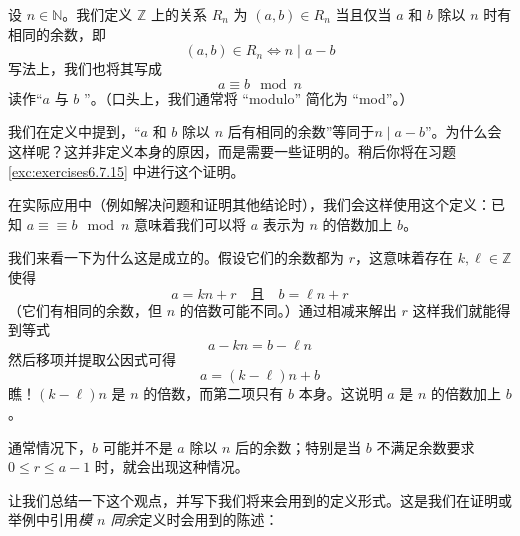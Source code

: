 \begin{definition}\label{def:definition6.5.4}
    设 $n \in \mathbb{N}$。我们定义 $\mathbb{Z}$ 上的关系 $R_n$ 为 $(a,b) \in R_n$ 当且仅当 $a$ 和 $b$ 除以 $n$ 时有相同的余数，即
    \[(a,b) \in R_n \iff n \mid a-b\] 
    写法上，我们也将其写成
    \[a \equiv b \mod n\]
    读作``$a$ 与 $b$ ''。（口头上，我们通常将 ``modulo'' 简化为 ``mod''。）
\end{definition}

\begin{remark}
    我们在定义中提到，``$a$ 和 $b$ 除以 $n$ 后有相同的余数''等同于$n \mid a - b$''。为什么会这样呢？这并非定义本身的原因，而是需要一些证明的。稍后你将在习题 \ref{exc:exercises6.7.15} 中进行这个证明。
\end{remark}

\begin{remark}
    在实际应用中（例如解决问题和证明其他结论时），我们会这样使用这个定义：已知 $a ≡\equiv b \mod n$ 意味着我们可以将 $a$ 表示为 $n$ 的倍数加上 $b$。
\end{remark}

我们来看一下为什么这是成立的。假设它们的余数都为 $r$，这意味着存在 $k, \ell \in \mathbb{Z}$ 使得
\[a = kn + r \quad\text{且}\quad b = \ell n + r\]
（它们有相同的余数，但 $n$ 的倍数可能不同。）通过相减来解出 $r$ 这样我们就能得到等式
\[a - kn = b - \ell n\]
然后移项并提取公因式可得
\[a = (k - \ell)n + b\]
瞧！$(k - \ell)n$ 是 $n$ 的倍数，而第二项只有 $b$ 本身。这说明 $a$ 是 $n$ 的倍数加上 $b$。

通常情况下，$b$ 可能并不是 $a$ 除以 $n$ 后的余数；特别是当 $b$ 不满足余数要求 $0 \le r \le a - 1$ 时，就会出现这种情况。

让我们总结一下这个观点，并写下我们将来会用到的定义形式。这是我们在证明或举例中引用\emph{模 $n$ 同余}定义时会用到的陈述：

\setlength{\fboxrule}{2pt}
\begin{center}
\end{center}

